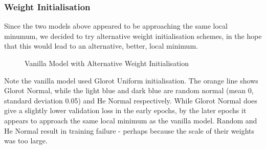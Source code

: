 \documentclass[11pt]{article} %
\theoremstyle{plain}
\theoremstyle{definition}
\begin{document}
\subsubsection{Weight Initialisation}
Since the two models above appeared to be approaching the same local minumum, we decided to try alternative weight initialisation schemes, in the hope that this would lead to an alternative, better, local minimum. 
\begin{figure}[!ht]
\centering
{}
\newline
{}
\caption{Vanilla Model with Alternative Weight Initialisation}
\label{fig:vanilla_weight_initialisation}
\end{figure}
\FloatBarrier
\noindent
Note the vanilla model used Glorot Uniform initialisation. The orange line shows Glorot Normal, while the light blue and dark blue are random normal (mean 0, standard deviation 0.05) and He Normal respectively. While Glorot Normal does give a slightly lower validation loss in the early epochs, by the later epochs it appears to approach the same local minimum as the vanilla model. Random and He Normal result in training failure - perhaps because the scale of their weights was too large.
\end{document}
